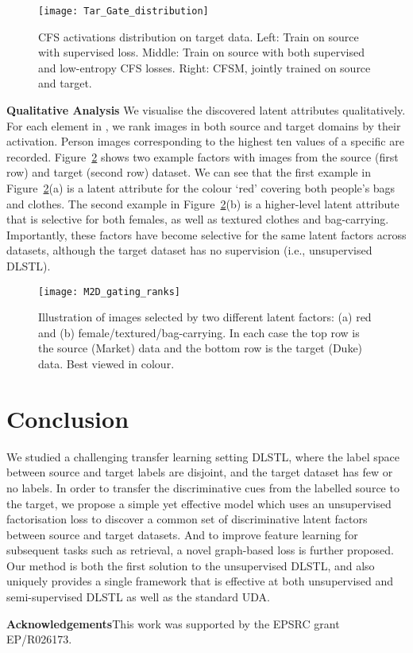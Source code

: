 \documentclass[letterpaper]{article} \usepackage{aaai19}  \usepackage{times}  \usepackage{helvet}  \usepackage{courier}  \usepackage{url}  \usepackage{graphicx}
\newcommand{\keypoint}[1]{\noindent\textbf{#1}\quad}
\begin{document}
\begin{figure}[t]
\centering    
\texttt{[image: Tar\_Gate\_distribution]}
\caption{CFS activations distribution on target data. Left: Train on source with supervised loss. Middle: Train on source with both supervised and low-entropy CFS losses. Right: CFSM, jointly trained on source and target.}
\label{fig:CFS_distribution}
\end{figure}

\keypoint{Qualitative Analysis} We visualise the discovered latent attributes qualitatively. For each element in , we rank images in both source and target domains by their activation. Person images corresponding to the highest ten values of a specific  are recorded. Figure~\ref{fig:CFS_latent_attri} shows two example factors with images from the source (first row) and target (second row) dataset. We can see that the first example in Figure~\ref{fig:CFS_latent_attri}(a) is a latent attribute for the colour `red' covering both people's bags and clothes. The second example in Figure~\ref{fig:CFS_latent_attri}(b) is a higher-level latent attribute that is selective for both females, as well as textured clothes and bag-carrying. Importantly, these factors have become selective for the same latent factors across  datasets, although the target dataset has no supervision (i.e., unsupervised DLSTL).



\begin{figure}[t]
\centering    
\texttt{[image: M2D\_gating\_ranks]}
\caption{Illustration of images selected by two different latent factors: (a) red and (b) female/textured/bag-carrying. In each case the top row is the source (Market) data  and the bottom row is the target (Duke) data. Best viewed in colour.}
\label{fig:CFS_latent_attri}
\end{figure}




\section{Conclusion}\label{Sec:Con}
We studied a challenging transfer learning setting DLSTL, where the label space between source and target labels are disjoint, and the target dataset has few or no labels. In order to transfer the discriminative cues from the labelled source to the target, we propose a simple yet effective model which uses an unsupervised factorisation loss to discover a common set of discriminative latent factors between source and target datasets. And to improve feature learning for subsequent tasks such as retrieval, a novel graph-based loss is further proposed. Our method is both the first solution to the unsupervised DLSTL, and also uniquely provides a single framework that is effective at both unsupervised and semi-supervised DLSTL as well as the standard UDA. 


\keypoint{Acknowledgements}This work was supported by the EPSRC grant EP/R026173.

{\small


}
\end{document}
